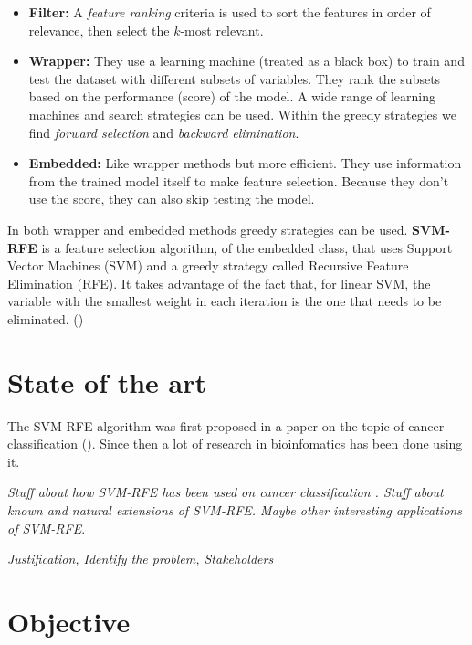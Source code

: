 \begin{itemize}
    \item \textbf{Filter:} A \emph{feature ranking} criteria is used to sort the features in order of relevance, then select the $k$-most relevant.
    \item \textbf{Wrapper:} They use a learning machine (treated as a black box) to train and test the dataset with different subsets of variables. They rank the subsets based on the performance (score) of the model. A wide range of learning machines and search strategies can be used. Within the greedy strategies we find \emph{forward selection} and \emph{backward elimination}.
    \item \textbf{Embedded:} Like wrapper methods but more efficient. They use information from the trained model itself to make feature selection. Because they don't use the score, they can also skip testing the model.
\end{itemize}

In both wrapper and embedded methods greedy strategies can be used. \textbf{SVM-RFE} is a feature selection algorithm, of the embedded class, that uses Support Vector Machines (SVM) and a greedy strategy called Recursive Feature Elimination (RFE). It takes advantage of the fact that, for linear SVM, the variable with the smallest weight in each iteration is the one that needs to be eliminated. (\cite{guyon_introduction_2003})


\section{State of the art}

The SVM-RFE algorithm was first proposed in a paper on the topic of cancer class\-ification (\cite{guyon_gene_2002}). Since then a lot of research in bioinfomatics has been done using it. 

\emph{Stuff about how SVM-RFE has been used on cancer classification . Stuff about known and natural extensions of SVM-RFE. Maybe other interesting applications of SVM-RFE}.

\emph{Justification, Identify the problem, Stakeholders}


\section{Objective}

